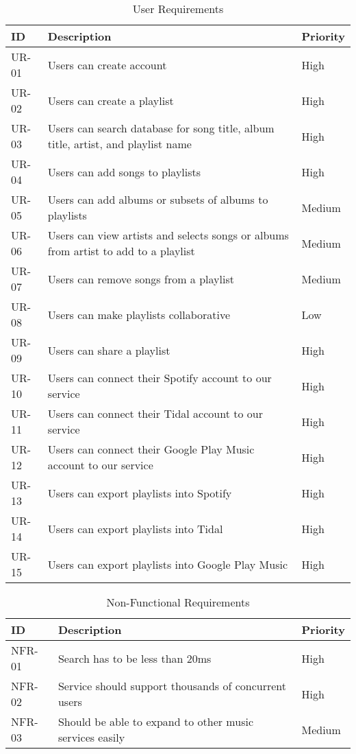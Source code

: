 \documentclass[12pt]{article}
\begin{document}
	\begin{table*}
		\centering
		\label{tab:ur}
		\caption*{User Requirements}
		\begin{tabularx}{450pt}{lXl}
			ID & Description & Priority\\\hline
			UR-01 & Users can create account & High \\
			UR-02 & Users can create a playlist & High \\
			UR-03 & Users can search database for song title, album title,
			artist, and playlist name & High \\
			UR-04 & Users can add songs to playlists & High \\
			UR-05 & Users can add albums or subsets of albums to playlists & Medium \\
			UR-06 & Users can view artists and selects songs or albums from artist to add to a playlist & Medium \\
			UR-07 & Users can remove songs from a playlist & Medium \\
			UR-08 & Users can make playlists collaborative & Low \\
			UR-09 & Users can share a playlist & High \\
			UR-10 & Users can connect their Spotify account to our service & High \\
			UR-11 & Users can connect their Tidal account to our service & High \\
			UR-12 & Users can connect their Google Play Music account to our service & High \\
			UR-13 & Users can export playlists into Spotify & High \\
			UR-14 & Users can export playlists into Tidal & High \\
			UR-15 & Users can export playlists into Google Play Music & High \\
		\end{tabularx}
	\end{table*}
	\begin{table*}
		\centering
		\label{tab:nfr}
		\caption*{Non-Functional Requirements}
		\begin{tabularx}{450pt}{lXl}
			ID & Description & Priority\\\hline
			NFR-01 & Search has to be less than 20ms & High \\
			NFR-02 & Service should support thousands of concurrent users & High \\
			NFR-03 & Should be able to expand to other music services easily & Medium \\
		\end{tabularx}
	\end{table*}
	
	
\end{document}
